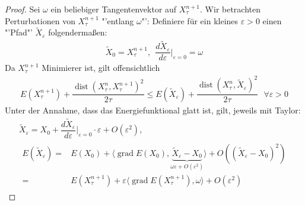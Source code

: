 \documentclass[11pt,a4paper,notitlepage]{scrreprt}
\newcommand{\dist}{\operatorname{dist}}
\newcommand{\grad}{\operatorname{grad}}
\begin{document}
\begin{proof}
Sei $\omega$ ein beliebiger Tangentenvektor auf $X_\tau^{n+1}$. Wir betrachten Perturbationen von $X_\tau^{n+1}$ "'entlang $\omega$"': Definiere für ein kleines $\varepsilon>0$ einen "'Pfad"' $\tilde{X}_\varepsilon$ folgendermaßen:\\
\begin{eqnarray}
\tilde{X}_0=X_\tau^{n+1},~~\dfrac{d\tilde{X}_\varepsilon}{d\varepsilon}\Bigg|_{\varepsilon=0} =\omega
\end{eqnarray}
Da $X_\tau^{n+1}$ Minimierer ist, gilt offensichtlich
\begin{eqnarray}
E(X_\tau^{n+1})+\dfrac{\dist(X_\tau^n,X_\tau^{n+1})^2}{2\tau}\leq E(\tilde{X}_\varepsilon)+\dfrac{\dist(X_\tau^n,\tilde{X}_\varepsilon)^2}{2\tau}~~~\forall \varepsilon>0 \label{a)}
\end{eqnarray}
Unter der Annahme, dass das Energiefunktional glatt ist, gilt, jeweils mit Taylor:
\begin{eqnarray}
\tilde{X}_\varepsilon = X_0+\dfrac{d\tilde{X}_\varepsilon}{d\varepsilon}\Bigg|_{\varepsilon=0}\cdot\varepsilon+O(\varepsilon^2),\\
\begin{split}
E(\tilde{X}_\varepsilon)=&E(X_0)+\langle\grad E(X_0),\underset{\omega\varepsilon+O(\varepsilon^2)}{\underbrace{\tilde{X}_\varepsilon -X_0}}\rangle+O((\tilde{X}_\varepsilon-X_0)^2)\\
=&E(X_\tau^{n+1})+\varepsilon\langle \grad E(X_\tau^{n+1}),\omega\rangle+O(\varepsilon^2) \label{b)}
\end{split}
\end{eqnarray}


\end{proof}
\end{document}

